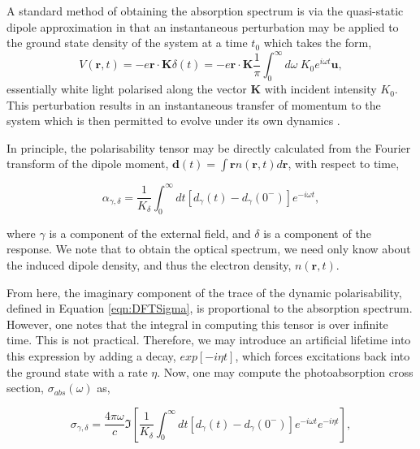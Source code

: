 A standard method of obtaining the absorption spectrum is via the quasi-static dipole approximation in that an instantaneous perturbation may be applied to the ground state density of the system at a time $t_{0}$ which takes the form, 
\begin{equation}
    V(\textbf{r},t) = -e\textbf{r}\cdot\textbf{K}\delta(t) = -e\textbf{r}\cdot\textbf{K}\frac{1}{\pi} \int_{0}^{\infty}d\omega~K_{0} e^{i\omega t}\textbf{u},
\end{equation}
essentially white light polarised along the vector $\textbf{K}$ with incident intensity $K_{0}$. This perturbation results in an instantaneous transfer of momentum to the system which is then permitted to evolve under its own dynamics \cite{Yabana1996}.


In principle, the polarisability tensor may be directly calculated from the Fourier transform of the dipole moment, $\mathbf{d}(t)=\int \mathbf{r} n(\mathbf{r},t) d\mathbf{r}$, with respect to time,


\begin{equation}
    \alpha_{\gamma,\delta} = \frac{1}{K_{\delta}}\int_{0}^{\infty} dt \left[ d_{\gamma}(t) - d_{\gamma}(0^{-})  \right]  e^{-i \omega t}
    \label{eqn:DFTAlpha},
\end{equation}

where $\gamma$ is a component of the external field, and $\delta$ is a component of the response. We note that to obtain the optical spectrum, we need only know about the induced dipole density, and thus the electron density, $n(\mathbf{r},t)$. 

From here, the imaginary component of the trace of the dynamic polarisability, defined in Equation \ref{eqn:DFTSigma}, is proportional to the absorption spectrum. However, one notes that the integral in computing this tensor is over infinite time. This is not practical. Therefore, we may introduce an artificial lifetime into this expression by adding a decay, $exp\left[ -i  \eta t \right]$, which forces excitations back into the ground state with a rate $\eta$. Now, one may compute the photoabsorption cross section, $\sigma_{abs}(\omega)$ as,

\begin{equation}
    \sigma_{\gamma,\delta} = \frac{4\pi\omega}{c} \Im\left[ \frac{1}{K_{\delta}}\int_{0}^{\infty} dt \left[ d_{\gamma}(t) - d_{\gamma}(0^{-})  \right]  e^{-i \omega t} e^{ -i  \eta t } \right]
    \label{eqn:DFTSigma},
\end{equation}

